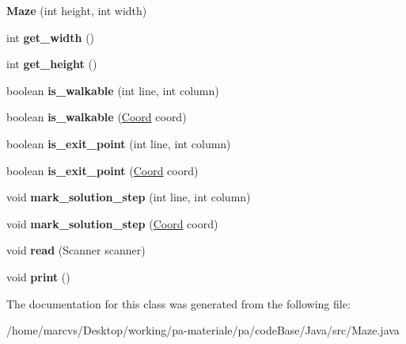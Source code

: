 \begin{DoxyCompactItemize}
\item 
\hypertarget{classMaze_a8f1cc7d8dd3fa426ace16bf32f54f24f}{
{\bfseries Maze} (int height, int width)}
\label{classMaze_a8f1cc7d8dd3fa426ace16bf32f54f24f}

\item 
\hypertarget{classMaze_a3f9b79edb99a9726da62bc6823ea9149}{
int {\bfseries get\_\-width} ()}
\label{classMaze_a3f9b79edb99a9726da62bc6823ea9149}

\item 
\hypertarget{classMaze_a43a3408e506b2f2463fc985865b3c850}{
int {\bfseries get\_\-height} ()}
\label{classMaze_a43a3408e506b2f2463fc985865b3c850}

\item 
\hypertarget{classMaze_a18724de009238efe119be4c80906416f}{
boolean {\bfseries is\_\-walkable} (int line, int column)}
\label{classMaze_a18724de009238efe119be4c80906416f}

\item 
\hypertarget{classMaze_a1156760e57f75cd36241a9244f902277}{
boolean {\bfseries is\_\-walkable} (\hyperlink{classCoord}{Coord} coord)}
\label{classMaze_a1156760e57f75cd36241a9244f902277}

\item 
\hypertarget{classMaze_ac223c8189bee28e047d4399cff5fa765}{
boolean {\bfseries is\_\-exit\_\-point} (int line, int column)}
\label{classMaze_ac223c8189bee28e047d4399cff5fa765}

\item 
\hypertarget{classMaze_a5ee98f5633093dc2e1cba6c03e4ddb54}{
boolean {\bfseries is\_\-exit\_\-point} (\hyperlink{classCoord}{Coord} coord)}
\label{classMaze_a5ee98f5633093dc2e1cba6c03e4ddb54}

\item 
\hypertarget{classMaze_a258ccfd950d62359774ed00a75591eaa}{
void {\bfseries mark\_\-solution\_\-step} (int line, int column)}
\label{classMaze_a258ccfd950d62359774ed00a75591eaa}

\item 
\hypertarget{classMaze_a0b27a912b886cd33a45d53789e4f2f1b}{
void {\bfseries mark\_\-solution\_\-step} (\hyperlink{classCoord}{Coord} coord)}
\label{classMaze_a0b27a912b886cd33a45d53789e4f2f1b}

\item 
\hypertarget{classMaze_a70725da73e2032a640bd80db1a51b1dc}{
void {\bfseries read} (Scanner scanner)}
\label{classMaze_a70725da73e2032a640bd80db1a51b1dc}

\item 
\hypertarget{classMaze_a6eb47c884e545475598f784707088f8b}{
void {\bfseries print} ()}
\label{classMaze_a6eb47c884e545475598f784707088f8b}

\end{DoxyCompactItemize}


The documentation for this class was generated from the following file:\begin{DoxyCompactItemize}
\item 
/home/marcvs/Desktop/working/pa-\/materiale/pa/codeBase/Java/src/Maze.java\end{DoxyCompactItemize}
